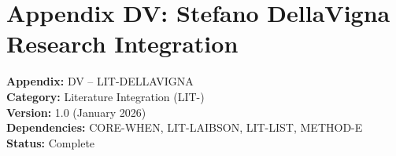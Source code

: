 
\chapter*{Appendix DV: Stefano DellaVigna Research Integration}
\label{app:dellavigna}

\begin{tcolorbox}[colback=white,colframe=black!75!white,title=Appendix Metadata]
\textbf{Appendix:} DV -- LIT-DELLAVIGNA \\
\textbf{Category:} Literature Integration (LIT-) \\
\textbf{Version:} 1.0 (January 2026) \\
\textbf{Dependencies:} CORE-WHEN, LIT-LAIBSON, LIT-LIST, METHOD-E \\
\textbf{Status:} Complete
\end{tcolorbox}

